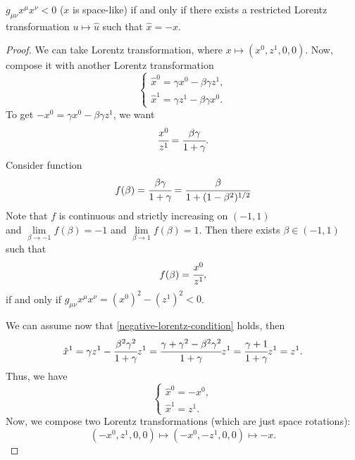 \documentclass[main.tex]{subfiles}
\begin{document}
\begin{fact}
\label{mirror-lorentz}
$g_{\mu\nu} x^\mu x^\nu < 0$ ($x$ is space-like) if and only if there exists a restricted Lorentz transformation $u \mapsto \hat{u}$ such that $\hat{x} = -x$.  
\end{fact}
\begin{proof}
We can take Lorentz transformation, where $x \mapsto (x^0, z^1, 0, 0)$.
Now, compose it with another Lorentz transformation
\begin{equation}
\begin{cases}
    \hat{x}^0 = \gamma x^0 - \beta \gamma z^1, \\
    \hat{x}^1 = \gamma z^1 -\beta \gamma x^0.
\end{cases}
\end{equation}
To get $-x^0 = \gamma x^0 - \beta \gamma z^1$, we want
\begin{equation}
\label{negative-lorentz-condition}
\cfrac{x^0}{z^1} = \cfrac{\beta\gamma}{1 + \gamma}.
\end{equation}
Consider function
\begin{equation}
f(\beta) = \cfrac{\beta\gamma}{1 + \gamma} = \cfrac{\beta}{1 + (1 -\beta^2)^{1/2}}
\end{equation}
Note that $f$ is continuous and strictly increasing on $(-1, 1)$ \\
and $\lim\limits_{\beta \to -1}f(\beta) = -1$ and $\lim\limits_{\beta \to 1}f(\beta) = 1$.
Then there exists $\beta\in(-1, 1)$ such that 
\begin{equation}
f(\beta) = \cfrac{x^0}{z^1},
\end{equation}
if and only if $g_{\mu\nu} x^\mu x^\nu = (x^0)^2 - (z^1)^2 < 0$.

We can assume now that \ref{negative-lorentz-condition} holds, then
\begin{equation}
\\
\hat{x}^1 = \gamma z^1 - \cfrac{\beta^2\gamma^2}{1 + \gamma}z^1 = \cfrac{\gamma + \gamma^2 - \beta^2\gamma^2}{1 + \gamma}z^1 = \cfrac{\gamma + 1}{1 + \gamma}z^1 = z^1.\\
\\
\end{equation}
Thus, we have
\begin{equation} 
\begin{cases}
    \hat{x}^0 = -x^0, \\
    \hat{x}^1 = z^1.
\end{cases}
\end{equation}
Now, we compose two Lorentz transformations (which are just space rotations):
\begin{equation}
(-x^0, z^1, 0, 0) \mapsto (-x^0, -z^1, 0, 0) \mapsto -x.
\end{equation}
\end{proof}
\end{document}
